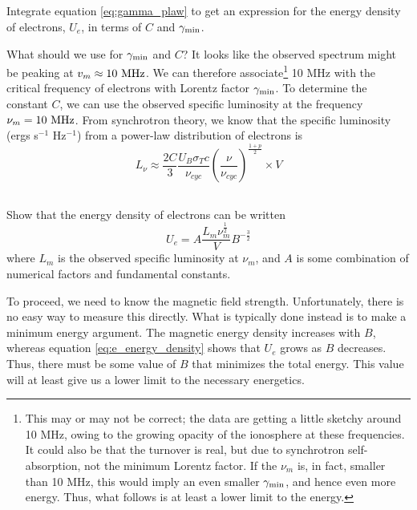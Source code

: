 \documentclass[11pt]{article}
\begin{document}
\subsection{}
Integrate equation \ref{eq:gamma_plaw} to get an expression for the energy density of
electrons, $U_e$, in terms of $C$ and $\gamma_{\rm min}$.

What should we use for $\gamma_{\rm min}$ and $C$?  It looks like the observed spectrum
might be peaking at $v_m\approx 10~{\rm MHz}$.  We can therefore associate\footnote{
This may or may not be correct; the data are getting a little sketchy around 10 MHz,
owing to the growing opacity of the ionosphere at these frequencies.  It could also
be that the turnover is real, but due to synchrotron self-absorption, not
the minimum Lorentz factor.  If the $\nu_m$ is, in fact, smaller than 10 MHz, this would
imply an even smaller $\gamma_{\rm min}$, and hence even more energy.  Thus, what
follows is at least a lower limit to the energy.}
10 MHz with the critical frequency of electrons with Lorentz factor $\gamma_{\rm min}$.  To
determine the constant $C$, we can use the observed specific luminosity at the frequency
$\nu_m=10~{\rm MHz}$.  From synchrotron theory, we know that the specific luminosity
(ergs s$^{-1}$ Hz$^{-1}$) from a power-law distribution of electrons is
\begin{equation}
L_\nu\approx\frac{2C}3\frac{U_B\sigma_Tc}{\nu_{cyc}}\left(\frac{\nu}{\nu_{cyc}}\right)^\frac{1+p}2\times V
\end{equation}

\subsection{}
Show that the energy density of electrons can be written
\begin{equation}
U_e=A\frac{L_m\nu_m^\frac12}{V}B^{-\frac32}
\label{eq:e_energy_density}
\end{equation}
where $L_m$ is the observed specific luminosity at $\nu_m$, and $A$ is some
combination of numerical factors and fundamental constants.

To proceed, we need to know the magnetic field strength. Unfortunately, there
is no easy way to measure this directly. What is typically done instead is to
make a minimum energy argument. The magnetic energy density increases with $B$,
whereas equation \ref{eq:e_energy_density} shows that $U_e$ grows as $B$ decreases. 
Thus, there must be some
value of $B$ that minimizes the total energy. This value will at least
give us a lower limit to the necessary energetics.
\end{document}
